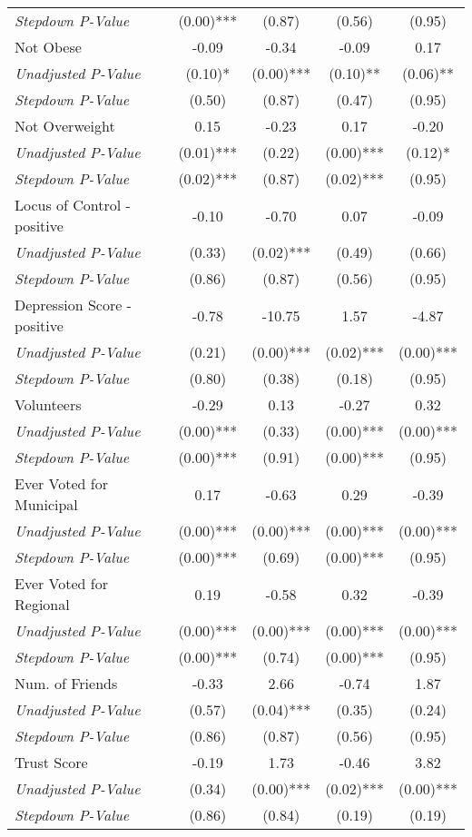 \begin{tabular}{l c c c c}
\quad \textit{Stepdown P-Value} & (0.00)*** & (0.87) & (0.56) & (0.95) \\
Not Obese & -0.09 & -0.34 & -0.09 & 0.17 \\
\quad \textit{Unadjusted P-Value} & (0.10)* & (0.00)*** & (0.10)** & (0.06)** \\
\quad \textit{Stepdown P-Value} & (0.50) & (0.87) & (0.47) & (0.95) \\
Not Overweight & 0.15 & -0.23 & 0.17 & -0.20 \\
\quad \textit{Unadjusted P-Value} & (0.01)*** & (0.22) & (0.00)*** & (0.12)* \\
\quad \textit{Stepdown P-Value} & (0.02)*** & (0.87) & (0.02)*** & (0.95) \\
Locus of Control - positive & -0.10 & -0.70 & 0.07 & -0.09 \\
\quad \textit{Unadjusted P-Value} & (0.33) & (0.02)*** & (0.49) & (0.66) \\
\quad \textit{Stepdown P-Value} & (0.86) & (0.87) & (0.56) & (0.95) \\
Depression Score - positive & -0.78 & -10.75 & 1.57 & -4.87 \\
\quad \textit{Unadjusted P-Value} & (0.21) & (0.00)*** & (0.02)*** & (0.00)*** \\
\quad \textit{Stepdown P-Value} & (0.80) & (0.38) & (0.18) & (0.95) \\
Volunteers & -0.29 & 0.13 & -0.27 & 0.32 \\
\quad \textit{Unadjusted P-Value} & (0.00)*** & (0.33) & (0.00)*** & (0.00)*** \\
\quad \textit{Stepdown P-Value} & (0.00)*** & (0.91) & (0.00)*** & (0.95) \\
Ever Voted for Municipal & 0.17 & -0.63 & 0.29 & -0.39 \\
\quad \textit{Unadjusted P-Value} & (0.00)*** & (0.00)*** & (0.00)*** & (0.00)*** \\
\quad \textit{Stepdown P-Value} & (0.00)*** & (0.69) & (0.00)*** & (0.95) \\
Ever Voted for Regional & 0.19 & -0.58 & 0.32 & -0.39 \\
\quad \textit{Unadjusted P-Value} & (0.00)*** & (0.00)*** & (0.00)*** & (0.00)*** \\
\quad \textit{Stepdown P-Value} & (0.00)*** & (0.74) & (0.00)*** & (0.95) \\
Num. of Friends & -0.33 & 2.66 & -0.74 & 1.87 \\
\quad \textit{Unadjusted P-Value} & (0.57) & (0.04)*** & (0.35) & (0.24) \\
\quad \textit{Stepdown P-Value} & (0.86) & (0.87) & (0.56) & (0.95) \\
Trust Score & -0.19 & 1.73 & -0.46 & 3.82 \\
\quad \textit{Unadjusted P-Value} & (0.34) & (0.00)*** & (0.02)*** & (0.00)*** \\
\quad \textit{Stepdown P-Value} & (0.86) & (0.84) & (0.19) & (0.19) \\
\bottomrule
\end{tabular}

